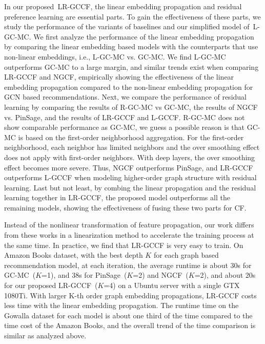 \documentclass[letterpaper]{article} %
\begin{document}
In our proposed~LR-GCCF, the linear embedding propagation and residual preference learning are essential parts. To gain the effectiveness of these parts, we study the performance of the variants of baselines and our simplified model of~L-GC-MC.
We first analyze the performance of the linear embedding propagation by comparing the linear embedding based models with the counterparts that use non-linear embeddings, i.e., L-GC-MC vs. GC-MC. We find L-GC-MC outperforms GC-MC to a large margin, and similar trends exist
when comparing LR-GCCF and NGCF, empirically showing the effectiveness of the linear embedding propagation compared to the non-linear embedding propagation for GCN based recommendations. Next, we compare the performance of residual learning by comparing
the results of  R-GC-MC vs GC-MC, the results of NGCF vs. PinSage, and the results of LR-GCCF and L-GCCF.  R-GC-MC does not show comparable performance as GC-MC, we guess a possible reason is that GC-MC is based on the first-order neighborhood aggregation. For the first-order neighborhood, each neighbor has limited neighbors and the over smoothing effect does not apply with first-order neighbors. With deep layers, the over smoothing effect  becomes more severe. Thus, NGCF outperforms PinSage, and LR-GCCF outperforms L-GCCF when modeling higher-order graph structure with residual learning.
Last but not least, by combing the linear propagation and the residual learning together in LR-GCCF, the proposed model outperforms all the remaining models, showing the effectiveness of fusing these two parts for CF.


Instead of the nonlinear transformation of  feature propagation, our work differs from these works in a linearization method to accelerate the training process at the same time. In practice, we find that LR-GCCF is very easy to train. On Amazon Books dataset, with the best depth $K$ for each graph based recommendation model, at each iteration, the average runtime is about 30s for GC-MC~($K$=1), and 38s for PinSage~($K$=2) and NGCF~($K$=2), and about 20s for our proposed LR-GCCF~($K$=4) on a Ubuntu server with a single GTX 1080Ti. With larger K-th order graph embedding propagations, LR-GCCF costs less time with the linear embedding propagation. The runtime time on the Gowalla dataset for each model is about one third of the time compared to the time cost of the Amazon Books, and the overall trend of the time comparison is similar as analyzed above.
\end{document}
